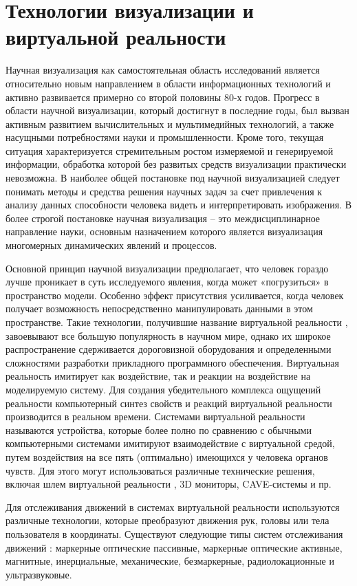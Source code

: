 \section{Технологии визуализации и виртуальной реальности }

Научная визуализация как самостоятельная область исследований является относительно новым направлением в области информационных технологий и активно развивается примерно со второй половины 80-х годов. Прогресс в области научной визуализации, который достигнут в последние годы, был вызван активным развитием вычислительных и мультимедийных технологий, а также насущными потребностями науки и промышленности. Кроме того, текущая ситуация характеризуется стремительным ростом измеряемой и генерируемой информации, обработка которой без развитых средств визуализации практически невозможна. В наиболее общей постановке под научной визуализацией следует понимать методы и средства решения научных задач за счет привлечения к анализу данных способности человека видеть и интерпретировать изображения. В более строгой постановке научная визуализация – это междисциплинарное направление науки, основным назначением которого является визуализация многомерных динамических явлений и процессов.

Основной принцип научной визуализации предполагает, что человек гораздо лучше проникает в суть исследуемого явления, когда может «погрузиться» в пространство модели. Особенно эффект присутствия усиливается, когда человек получает возможность непосредственно манипулировать данными в этом пространстве. Такие технологии, получившие название виртуальной реальности \citep{dk51}\citep{dk52}, завоевывают все большую популярность в научном мире, однако их широкое распространение сдерживается дороговизной оборудования и определенными сложностями разработки прикладного программного обеспечения. Виртуальная реальность имитирует как воздействие, так и реакции на воздействие на моделируемую систему. Для создания убедительного комплекса ощущений реальности компьютерный синтез свойств и реакций виртуальной реальности производится в реальном времени. Системами виртуальной реальности называются устройства, которые более полно по сравнению с обычными компьютерными системами имитируют взаимодействие с виртуальной средой, путем воздействия на все пять (оптимально) имеющихся у человека органов чувств. Для этого могут использоваться различные технические решения, включая шлем виртуальной реальности \citep{dk53}, 3D мониторы, CAVE-системы \citep{dk54} и пр.

Для отслеживания движений в системах виртуальной реальности используются различные технологии, которые преобразуют движения рук, головы или тела пользователя в координаты. Существуют следующие типы систем отслеживания движений \citep{dk55}: маркерные оптические пассивные, маркерные оптические активные, магнитные, инерциальные, механические, безмаркерные, радиолокационные и ультразвуковые.

